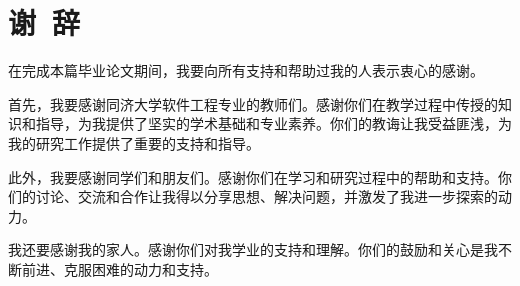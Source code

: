 \section*{谢\ 辞}

在完成本篇毕业论文期间，我要向所有支持和帮助过我的人表示衷心的感谢。

首先，我要感谢同济大学软件工程专业的教师们。感谢你们在教学过程中传授的知识和指导，为我提供了坚实的学术基础和专业素养。你们的教诲让我受益匪浅，为我的研究工作提供了重要的支持和指导。

此外，我要感谢同学们和朋友们。感谢你们在学习和研究过程中的帮助和支持。你们的讨论、交流和合作让我得以分享思想、解决问题，并激发了我进一步探索的动力。

我还要感谢我的家人。感谢你们对我学业的支持和理解。你们的鼓励和关心是我不断前进、克服困难的动力和支持。